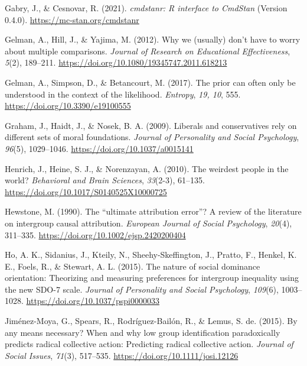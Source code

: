 \documentclass[12pt, letterpaper]{article}
\newenvironment{CSLReferences}[2]{}{}
\begin{document}
\begin{CSLReferences}{1}{0}
\leavevmode{}%
Gabry, J., \& Cesnovar, R. (2021). \emph{{cmdstanr}: {R} interface to
{CmdStan}} (Version 0.4.0). \url{https://mc-stan.org/cmdstanr}

\leavevmode{}%
Gelman, A., Hill, J., \& Yajima, M. (2012). Why we (usually) don't have
to worry about multiple comparisons. \emph{Journal of Research on
Educational Effectiveness}, \emph{5}(2), 189--211.
\url{https://doi.org/10.1080/19345747.2011.618213}

\leavevmode{}%
Gelman, A., Simpson, D., \& Betancourt, M. (2017). The prior can often
only be understood in the context of the likelihood. \emph{Entropy},
\emph{19, 10}, 555. \url{https://doi.org/10.3390/e19100555}

\leavevmode{}%
Graham, J., Haidt, J., \& Nosek, B. A. (2009). Liberals and
conservatives rely on different sets of moral foundations. \emph{Journal
of Personality and Social Psychology}, \emph{96}(5), 1029--1046.
\url{https://doi.org/10.1037/a0015141}

\leavevmode{}%
Henrich, J., Heine, S. J., \& Norenzayan, A. (2010). The weirdest people
in the world? \emph{Behavioral and Brain Sciences}, \emph{33}(2-3),
61--135. \url{https://doi.org/10.1017/S0140525X10000725}

\leavevmode{}%
Hewstone, M. (1990). The {``ultimate attribution error''}? {A} review of
the literature on intergroup causal attribution. \emph{European Journal
of Social Psychology}, \emph{20}(4), 311--335.
\url{https://doi.org/10.1002/ejsp.2420200404}

\leavevmode{}%
Ho, A. K., Sidanius, J., Kteily, N., Sheehy-Skeffington, J., Pratto, F.,
Henkel, K. E., Foels, R., \& Stewart, A. L. (2015). The nature of social
dominance orientation: {Theorizing} and measuring preferences for
intergroup inequality using the new {SDO}-7 scale. \emph{Journal of
Personality and Social Psychology}, \emph{109}(6), 1003--1028.
\url{https://doi.org/10.1037/pspi0000033}

\leavevmode{}%
Jiménez-Moya, G., Spears, R., Rodríguez-Bailón, R., \& Lemus, S. de.
(2015). By any means necessary? {When} and why low group identification
paradoxically predicts radical collective action: Predicting radical
collective action. \emph{Journal of Social Issues}, \emph{71}(3),
517--535. \url{https://doi.org/10.1111/josi.12126}


\end{CSLReferences}
\end{document}

